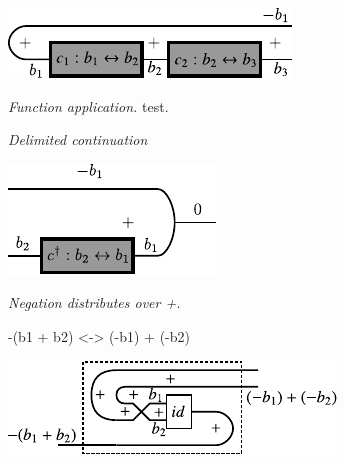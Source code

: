 \documentclass[preprint]{sigplanconf}
\begin{document}
\begin{center}
  \includegraphics{diagrams/compose2.pdf}
\end{center}

\emph{Function application.}
test.
\begin{multicols}{2}
\begin{center}
\end{center}
\begin{center}
\end{center}
\end{multicols}

\emph{Delimited continuation}

\begin{center}
  \includegraphics{diagrams/delimc.pdf}
\end{center}

\emph{Negation distributes over {{+}}. }

{{-(b1 + b2) <-> (-b1) + (-b2)}}

\begin{center}
  \includegraphics{diagrams/dist_neg_plus.pdf}
\end{center}
\end{document}
